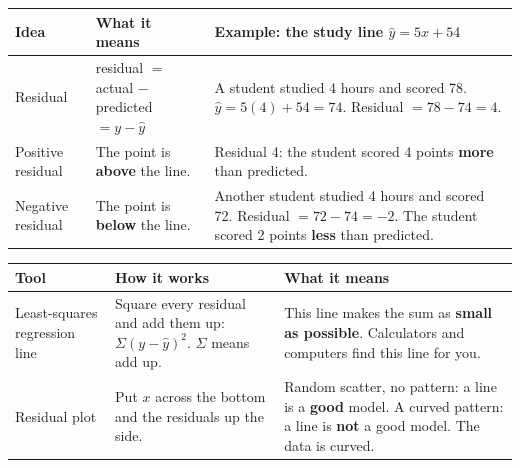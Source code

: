 \documentclass[11pt]{article}
\newcommand{\sumhead}[1]{\par\vspace{0.7em}{\large\bfseries #1}\par\vspace{0.3em}}
\begin{document}
\sumhead{Residuals}
\begin{tabular}{|L{1.2in}|L{2.75in}|L{2.5in}|}\hline
\textbf{Idea} & \textbf{What it means} & \textbf{Example: the study line $\hat{y} = 5x + 54$}\\ \hline
Residual & residual $=$ actual $-$ predicted $= y - \hat{y}$ & A student studied 4 hours and scored 78. $\hat{y} = 5(4) + 54 = 74$. Residual $= 78 - 74 = 4$.\\ \hline
Positive residual & The point is \textbf{above} the line. & Residual 4: the student scored 4 points \textbf{more} than predicted.\\ \hline
Negative residual & The point is \textbf{below} the line. & Another student studied 4 hours and scored 72. Residual $= 72 - 74 = -2$. The student scored 2 points \textbf{less} than predicted.\\ \hline
\end{tabular}

\sumhead{Least Squares and Residual Plots}
\begin{tabular}{|L{1.2in}|L{2.75in}|L{2.5in}|}\hline
\textbf{Tool} & \textbf{How it works} & \textbf{What it means}\\ \hline
Least-squares regression line & Square every residual and add them up: $\Sigma(y - \hat{y})^2$. $\Sigma$ means add up. & This line makes the sum as \textbf{small as possible}. Calculators and computers find this line for you.\\ \hline
Residual plot & Put $x$ across the bottom and the residuals up the side. & Random scatter, no pattern: a line is a \textbf{good} model. A curved pattern: a line is \textbf{not} a good model. The data is curved.\\ \hline
\end{tabular}
\end{document}
